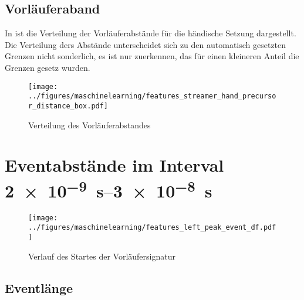 \subsection{Vorläuferaband}
In  ist die Verteilung der Vorläuferabstände für die händische Setzung dargestellt. Die Verteilung ders Abstände unterscheidet sich zu den automatisch gesetzten Grenzen nicht sonderlich, es ist nur zuerkennen, das für einen kleineren Anteil die Grenzen gesetz wurden.

\begin{figure}[htbp]
    \centering
      \texttt{[image: ../figures/maschinelearning/features\_streamer\_hand\_precursor\_distance\_box.pdf]}
      \caption{Verteilung des Vorläuferabstandes}
      \label{fig:streamer_hand_prec_distance_box}
\end{figure}


\begin{table}[h!]
\centering
\caption{Model Performance für die Vorhersage der Vorläuferabstände}
\end{table}

\section{Eventabstände im Interval \SIrange{2e-9}{3e-8}{\second}}

\begin{figure}[htbp]
    \centering
      \texttt{[image: ../figures/maschinelearning/features\_left\_peak\_event\_df.pdf]}
      \caption{Verlauf des Startes der Vorläufersignatur}
      \label{fig:event_left_current_sliece}
\end{figure}

\subsection{Eventlänge}

